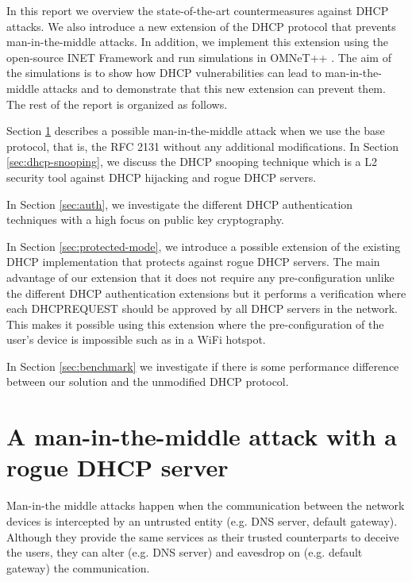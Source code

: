 \documentclass[letterpaper, 10 pt, conference]{ieeeconf}  %
\begin{document}
In this report we overview the state-of-the-art countermeasures against DHCP attacks. We also introduce a new extension of the DHCP protocol that prevents man-in-the-middle attacks. In addition, we implement this extension using the open-source INET Framework \cite{inet} and run simulations in OMNeT++ \cite{Varga:2008:OOS:1416222.1416290}. The aim of the simulations is to show how DHCP vulnerabilities can lead to man-in-the-middle attacks and to demonstrate that this new extension can prevent them. The rest of the report is organized as follows.

Section \ref{sec:man-in-the-middle} describes a possible man-in-the-middle attack when we use the base protocol, that is, the RFC 2131 without any additional modifications. In Section \ref{sec:dhcp-snooping}, we discuss the DHCP snooping technique which is a L2 security tool against DHCP hijacking and rogue DHCP servers. 

In Section \ref{sec:auth}, we investigate the different DHCP authentication techniques with a high focus on public key cryptography.

In Section \ref{sec:protected-mode}, we introduce a possible extension of the existing DHCP implementation that protects against rogue DHCP servers. The main advantage of our extension that it does not require any pre-configuration unlike the different DHCP authentication extensions but it performs a verification where each DHCPREQUEST should be approved by all DHCP servers in the network. This makes it possible using this extension where the pre-configuration of the user's device is impossible such as in a WiFi hotspot. 

In Section \ref{sec:benchmark} we investigate if there is some performance difference between our solution and the unmodified DHCP protocol.
 
\section{A man-in-the-middle attack with a rogue DHCP server}\label{sec:man-in-the-middle}
Man-in-the middle attacks happen when the communication between the network devices is intercepted by an untrusted entity (e.g. DNS server, default gateway). Although they provide the same services as their trusted counterparts to deceive the users, they can alter (e.g. DNS server) and eavesdrop on (e.g. default gateway) the communication.
\end{document}
